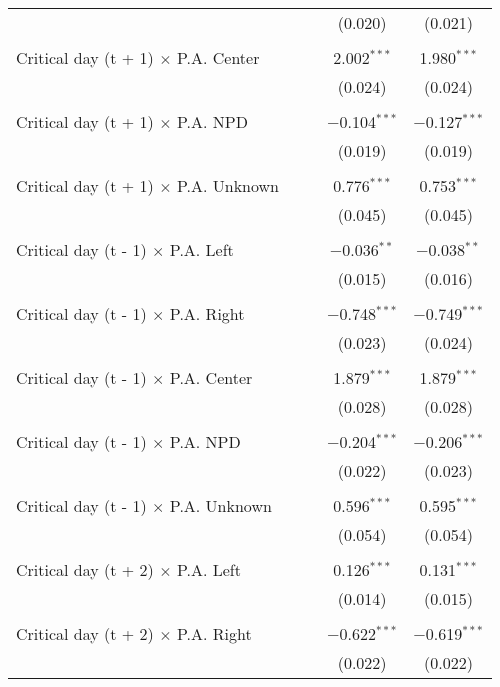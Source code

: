\documentclass[
]{article}
\begin{document}
\begin{table}[!htbp]
{\begin{tabular}{@{\extracolsep{5pt}}lcccc}
  &  &  & (0.020) & (0.021) \\ 
  & & & & \\ 
 Critical day (t + 1) $\times$ P.A. Center &  &  & 2.002$^{***}$ & 1.980$^{***}$ \\ 
  &  &  & (0.024) & (0.024) \\ 
  & & & & \\ 
 Critical day (t + 1) $\times$ P.A. NPD &  &  & $-$0.104$^{***}$ & $-$0.127$^{***}$ \\ 
  &  &  & (0.019) & (0.019) \\ 
  & & & & \\ 
 Critical day (t + 1) $\times$ P.A. Unknown &  &  & 0.776$^{***}$ & 0.753$^{***}$ \\ 
  &  &  & (0.045) & (0.045) \\ 
  & & & & \\ 
 Critical day (t - 1) $\times$ P.A. Left &  &  & $-$0.036$^{**}$ & $-$0.038$^{**}$ \\ 
  &  &  & (0.015) & (0.016) \\ 
  & & & & \\ 
 Critical day (t - 1) $\times$ P.A. Right &  &  & $-$0.748$^{***}$ & $-$0.749$^{***}$ \\ 
  &  &  & (0.023) & (0.024) \\ 
  & & & & \\ 
 Critical day (t - 1) $\times$ P.A. Center &  &  & 1.879$^{***}$ & 1.879$^{***}$ \\ 
  &  &  & (0.028) & (0.028) \\ 
  & & & & \\ 
 Critical day (t - 1) $\times$ P.A. NPD &  &  & $-$0.204$^{***}$ & $-$0.206$^{***}$ \\ 
  &  &  & (0.022) & (0.023) \\ 
  & & & & \\ 
 Critical day (t - 1) $\times$ P.A. Unknown &  &  & 0.596$^{***}$ & 0.595$^{***}$ \\ 
  &  &  & (0.054) & (0.054) \\ 
  & & & & \\ 
 Critical day (t + 2) $\times$ P.A. Left &  &  & 0.126$^{***}$ & 0.131$^{***}$ \\ 
  &  &  & (0.014) & (0.015) \\ 
  & & & & \\ 
 Critical day (t + 2) $\times$ P.A. Right &  &  & $-$0.622$^{***}$ & $-$0.619$^{***}$ \\ 
  &  &  & (0.022) & (0.022) \\ 

\end{tabular}}
\end{table}
\end{document}
